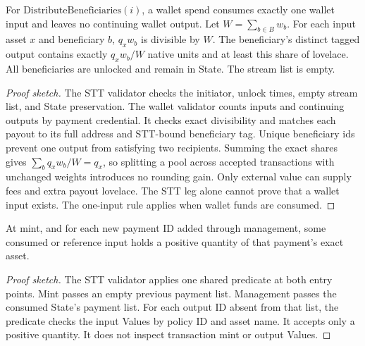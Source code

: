 \documentclass[11pt,DIV=11,parskip=half-]{scrartcl}
\begin{document}
\begin{theorem}
For $\mathrm{DistributeBeneficiaries}(i)$, a wallet spend consumes exactly one wallet input and leaves no continuing wallet output. Let $W=\sum_{b\in B}w_b$. For each input asset $x$ and beneficiary $b$, $q_x w_b$ is divisible by $W$. The beneficiary's distinct tagged output contains exactly $q_x w_b/W$ native units and at least this share of lovelace. All beneficiaries are unlocked and remain in State. The stream list is empty.
\end{theorem}
\begin{proof}[Proof sketch]
The STT validator checks the initiator, unlock times, empty stream list, and State preservation. The wallet validator counts inputs and continuing outputs by payment credential. It checks exact divisibility and matches each payout to its full address and STT-bound beneficiary tag. Unique beneficiary ids prevent one output from satisfying two recipients. Summing the exact shares gives $\sum_b q_x w_b/W=q_x$, so splitting a pool across accepted transactions with unchanged weights introduces no rounding gain. Only external value can supply fees and extra payout lovelace. The STT leg alone cannot prove that a wallet input exists. The one-input rule applies when wallet funds are consumed.
\end{proof}

\begin{theorem}
At mint, and for each new payment ID added through management, some consumed or reference input holds a positive quantity of that payment's exact asset.
\end{theorem}
\begin{proof}[Proof sketch]
The STT validator applies one shared predicate at both entry points. Mint passes an empty previous payment list. Management passes the consumed State's payment list. For each output ID absent from that list, the predicate checks the input Values by policy ID and asset name. It accepts only a positive quantity. It does not inspect transaction mint or output Values.
\end{proof}
\end{document}
